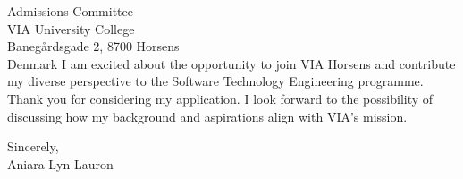 \documentclass[11pt,a4paper]{letter}
\begin{document}
\begin{letter}{Admissions Committee \\ VIA University College \\ Banegårdsgade 2, 8700 Horsens \\ Denmark}
I am excited about the opportunity to join VIA Horsens and contribute my diverse perspective to the Software Technology Engineering programme. Thank you for considering my application. I look forward to the possibility of discussing how my background and aspirations align with VIA's mission.


\closing{Sincerely, \\
Aniara Lyn Lauron}

\end{letter}
\end{document}
